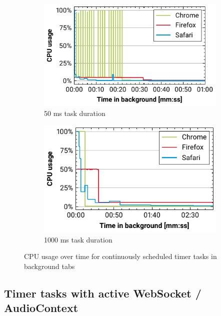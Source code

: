 \documentclass[
	ruledheaders=section,%
	class=report,%
	thesis={type=bachelor},%
	accentcolor=9c,%
	custommargins=true,%
	marginpar=false,%
	parskip=half-,%
	fontsize=11pt,%
]{tudapub}
\begin{document}
  
  \begin{figure}
    \begin{subfigure}[t]{0.5\textwidth}
      \includegraphics[width=\textwidth]{images/timer-50.pdf}
      \caption{50 ms task duration}
    \end{subfigure}
    \hfill
    \begin{subfigure}[t]{0.5\textwidth}
      \includegraphics[width=\textwidth]{images/timer-1000.pdf}
      \caption{1000 ms task duration}
    \end{subfigure}

    \caption{CPU usage over time for continuously scheduled timer tasks in background tabs}
    \label{fig:timer}
  \end{figure}

  \subsection{Timer tasks with active WebSocket / AudioContext}
\end{document}
